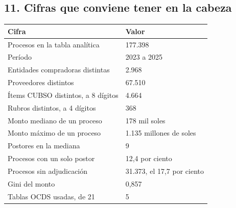 \documentclass[11pt]{article}
\begin{document}
\subsection*{11. Cifras que conviene tener en la cabeza}
\begin{center}\footnotesize
\begin{tabularx}{\linewidth}{Q{1.133}Q{0.867}}
\toprule
\textbf{Cifra} & \textbf{Valor} \\
\midrule
Procesos en la tabla analítica & 177.398 \\
Período & 2023 a 2025 \\
Entidades compradoras distintas & 2.968 \\
Proveedores distintos & 67.510 \\
Ítems CUBSO distintos, a 8 dígitos & 4.664 \\
Rubros distintos, a 4 dígitos & 368 \\
Monto mediano de un proceso & 178 mil soles \\
Monto máximo de un proceso & 1.135 millones de soles \\
Postores en la mediana & 9 \\
Procesos con un solo postor & 12,4 por ciento \\
Procesos sin adjudicación & 31.373, el 17,7 por ciento \\
Gini del monto & 0,857 \\
Tablas OCDS usadas, de 21 & 5 \\
\bottomrule
\end{tabularx}
\end{center}
\end{document}
